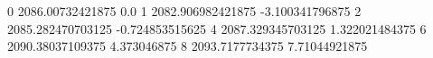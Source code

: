 0 2086.00732421875 0.0
1 2082.906982421875 -3.100341796875
2 2085.282470703125 -0.724853515625
4 2087.329345703125 1.322021484375
6 2090.38037109375 4.373046875
8 2093.7177734375 7.71044921875
